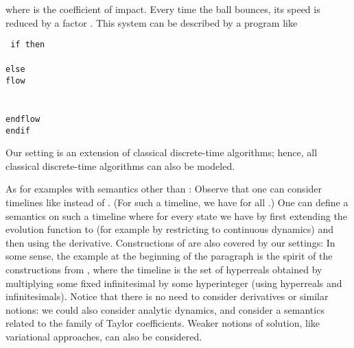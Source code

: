\documentclass[envcountsame]{llncs}
\newenvironment{ttcode}{\begin{ttfamily}\rm\tt}{\end{ttfamily}}
\newcommand\s{\phantom{x}}
\begin{document}
where  is the coefficient of impact. Every time the ball
bounces, its speed is reduced by a factor .
This system can be described by a program like

\bigskip

\noindent
\qquad\begin{minipage}{15cm}
\begin{ttcode}
if  then \\
\s   \\
else \\
\s flow \\
\s\s    \\
\s\s   \\
\s endflow \\
endif
\end{ttcode}
\end{minipage}

\bigskip

Our setting is an extension of classical discrete-time algorithms; hence, all classical discrete-time algorithms can also be modeled.

 As for examples with semantics other than :  Observe
  that one can consider timelines like  instead of . (For such
  a timeline, we have  for all .) One
  can define a semantics on such a timeline where for every state 
  we have  by first extending the evolution function
  to  (for example by
restricting to continuous
  dynamics) and then using the derivative.
Constructions of \cite{rust2000hybrid} are also covered by our
  settings: In some sense, the example at the beginning of the paragraph is the
  spirit of the constructions from \cite{rust2000hybrid}, where the
  timeline is the set of hyperreals obtained by multiplying some fixed
  infinitesimal by some hyperinteger (using hyperreals and
  infinitesimals).
Notice  that there is no need to consider derivatives or similar
notions: we could also consider analytic dynamics, and consider a
semantics related to the family of  Taylor coefficients. Weaker
notions of solution, like variational approaches, can also be considered.









\end{document}
